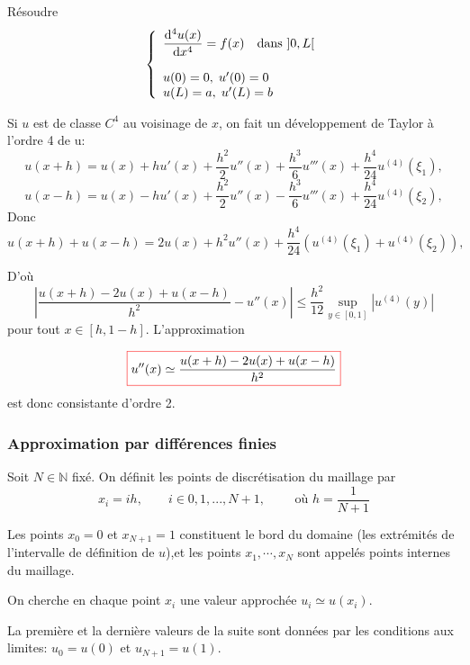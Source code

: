 \documentclass{beamer}
\def \de {{\rm d}}
\newcommand{\myredbox}[1]{\fcolorbox{red}{white}{$\displaystyle#1$}}
\begin{document}
\begin{frame}
Résoudre
\[\left\{\begin{array}{l}
\displaystyle \frac{\de ^4 u(x)}{\de x^4} =f(x)\quad\mbox{dans }]0,L[\\
\\
u(0)=0,\;u'(0)=0\\
 u(L)=a,\;u'(L)=b
\end{array}\right.\]
\end{frame}
\begin{frame}
Si $u$ est de classe $C^4$ au voisinage de $x$, on fait un développement de Taylor à l'ordre 4 de u:
\[u(x+h)=u(x)+h u'(x)+\frac{h^2}2 u''(x)+\frac{h^3}6 u'''(x)+\frac{h^4}{24} u^{(4)}(\xi_1) ,\]
\[u(x-h)=u(x)-h u'(x)+\frac{h^2}2 u''(x)-\frac{h^3}6 u'''(x)+\frac{h^4}{24} u^{(4)}(\xi_2) ,\]
Donc
\[u(x+h)+u(x-h)=2u(x)+h^2 u''(x)+\frac{h^4}{24} \left(u^{(4)}(\xi_1) + u^{(4)}(\xi_2)\right) ,\]




D'où
\[\left| \frac{u(x+h)-2u(x)+u(x-h)}{h^2}- u''(x) \right|\leq \frac{h^2}{12}\sup_{y\in[0,1]} |u^{(4)}(y)| \]
pour tout $x \in [h, 1 - h]$. L'approximation 

 \[\myredbox{u''(x)\simeq \frac{u(x+h)-2u(x)+u(x-h)}{h^2}}\] 
 est donc consistante d'ordre 2. 
\end{frame}
 
 
 \begin{frame}
\frametitle{Approximation  par différences finies}
 \begin{center}
 \end{center}
Soit $N \in \mathbb{N}$ fixé. On définit les points de discrétisation du maillage par 
\[x_i =ih, \qquad i\in{0,1,...,N+1}, \qquad \mbox{ où } h= \frac{1}{N+1}\]

Les points $x_0 = 0$ et $x_{N+1} = 1$ constituent le bord du domaine (les extrémités de l'intervalle de définition de $u$),et les points $x_1,\cdots ,x_N$ sont appelés points internes du maillage.

On cherche en chaque point $x_i$ une valeur approchée $u_i\simeq u(x_i)$. 

La première et la dernière valeurs de la suite sont données par les conditions aux limites: $u_0 = u(0)$ et $u_{N+1} = u(1)$.
\end{frame}
 
\end{document}
